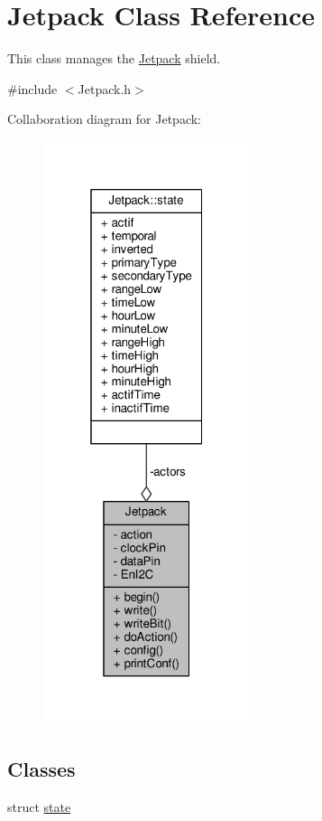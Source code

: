\hypertarget{class_jetpack}{}\section{Jetpack Class Reference}
\label{class_jetpack}


This class manages the \hyperlink{class_jetpack}{Jetpack} shield.  




{\ttfamily \#include $<$Jetpack.\+h$>$}



Collaboration diagram for Jetpack\+:\nopagebreak
\begin{figure}[H]
\begin{center}
\leavevmode
\includegraphics[width=172pt]{da/db7/class_jetpack__coll__graph}
\end{center}
\end{figure}
\subsection*{Classes}
\begin{DoxyCompactItemize}
\item 
struct \hyperlink{struct_jetpack_1_1state}{state}
\end{DoxyCompactItemize}
